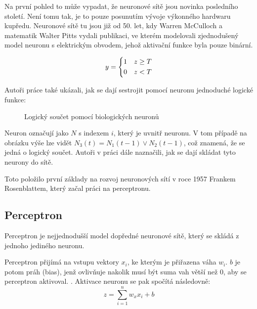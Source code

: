 \documentclass[FM,BP,fonts]{tulthesis}
\begin{document}
Na první pohled to může vypadat, že neuronové sítě jsou novinka posledního století. Není tomu tak, je to pouze posunutím vývoje výkonného hardwaru kupředu. Neuronové sítě tu jsou již od 50. let, kdy Warren McCulloch a matematik Walter Pitts vydali publikaci, ve kterém modelovali zjednodušený model neuronu s elektrickým obvodem, jehož aktivační funkce byla pouze binární. \cite{mcculloch1943logical}

\begin{equation}
	y = \begin{dcases}
		1 & z \geq T \\
		0 & z < T
	\end{dcases}
\end{equation}

Autoři práce také ukázali, jak se dají sestrojit pomocí neuronu jednoduché logické funkce: 

\begin{figure}[htbp]
	\centering
	\caption{Logický součet pomocí biologických neuronů}
	\label{fig:logic_or}
\end{figure}

Neuron označují jako $N$ s indexem $i$, který je uvnitř neuronu. V tom případě na obrázku výše lze vidět $N_3(t) = N_1(t-1) \vee N_2(t-1)$, což znamená, že se jedná o logický součet. \cite{mcculloch1943logical} Autoři v práci dále naznačili, jak se dají skládat tyto neurony do sítě. 

Toto položilo první základy na rozvoj neuronových sítí v roce 1957 Frankem Rosenblattem, který začal práci na perceptronu.
\newpage
\subsection{Perceptron}
Perceptron je nejjednodušší model dopředné neuronové sítě, který se skládá z jednoho jediného neuronu.

Perceptron přijímá na vstupu vektory $x_i$, ke kterým je přiřazena váha $w_i$. $b$ je potom práh (bias), jenž ovlivňuje nakolik musí být suma vah větší než 0, aby se perceptron aktivoval. \cite{martinpilatNN}. Aktivace neuronu se pak spočítá následovně:
\label{eq:activation_percep}
\begin{equation}
	z = \sum_{i=1}^{n} w_xx_i + b
\end{equation}
\end{document}
